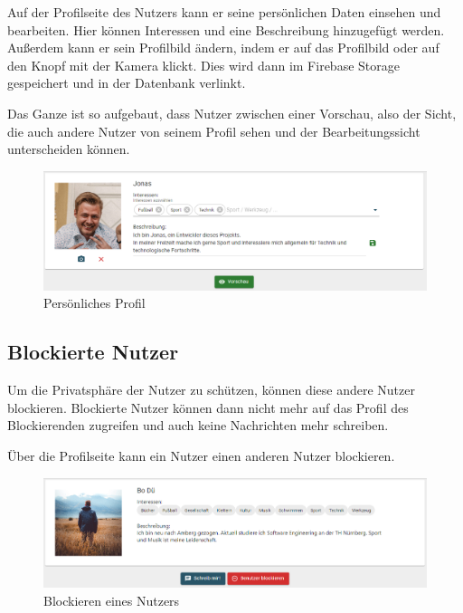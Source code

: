 Auf der Profilseite des Nutzers kann er seine persönlichen Daten einsehen und bearbeiten. Hier können Interessen und eine Beschreibung hinzugefügt werden.
Außerdem kann er sein Profilbild ändern, indem er auf das Profilbild oder auf den Knopf mit der Kamera klickt.
Dies wird dann im Firebase Storage gespeichert und in der Datenbank verlinkt.

Das Ganze ist so aufgebaut, dass Nutzer zwischen einer Vorschau, also der Sicht, die auch andere Nutzer von seinem Profil sehen und der Bearbeitungssicht unterscheiden können.

\begin{figure}[ht!]
  \begin{centering}
    \includegraphics[width=1\textwidth]{figures/implementation/my-profile-header.png}
    \caption{Persönliches Profil}
    \label{fig:myProfileHeader}
  \end{centering}
\end{figure}

\subsection{Blockierte Nutzer}
\label{sec:blockedusers}

Um die Privatsphäre der Nutzer zu schützen, können diese andere Nutzer blockieren.
Blockierte Nutzer können dann nicht mehr auf das Profil des Blockierenden zugreifen und auch keine Nachrichten mehr schreiben.

Über die Profilseite kann ein Nutzer einen anderen Nutzer blockieren.

\begin{figure}[ht!]
  \begin{centering}
    \includegraphics[width=1\textwidth]{figures/implementation/profile-header.png}
    \caption{Blockieren eines Nutzers}
    \label{fig:blockUser}
  \end{centering}
\end{figure}

